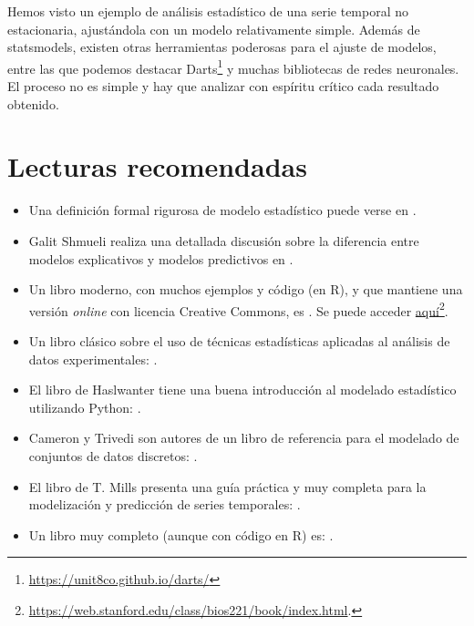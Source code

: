 Hemos visto un ejemplo de análisis estadístico de una serie temporal no estacionaria, ajustándola con un modelo relativamente simple. Además de statsmodels, existen otras herramientas poderosas para el ajuste de modelos, entre las que podemos destacar Darts\footnote{\url{https://unit8co.github.io/darts/}} y muchas bibliotecas de redes neuronales. El proceso no es simple y hay que analizar con espíritu crítico cada resultado obtenido.


\section{Lecturas recomendadas}
\begin{itemize}
\item Una definición formal rigurosa de modelo estadístico puede verse en .
\item Galit Shmueli realiza una detallada discusión sobre la diferencia entre modelos explicativos y modelos predictivos en .
\item Un libro moderno, con muchos ejemplos y código (en R), y que mantiene una versión \textit{online} con licencia Creative Commons, es . Se puede acceder \href{https://web.stanford.edu/class/bios221/book/index.html}{aquí}\footnote{\url{https://web.stanford.edu/class/bios221/book/index.html}.}.
\item Un libro clásico sobre el uso de técnicas estadísticas aplicadas al análisis de datos experimentales: .
\item El libro de Haslwanter tiene una buena introducción al modelado estadístico utilizando Python: .
\item Cameron y Trivedi son autores de un libro de referencia para el modelado de conjuntos de datos discretos: .
\item El libro de T. Mills presenta una guía práctica y muy completa para la modelización y predicción de series temporales: .
\item Un libro muy completo (aunque con código en R) es: .
\end{itemize}
